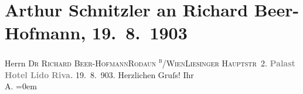 

         
         \renewcommand{\erwaehntePersonen}{Personen: Richard Beer-Hofmann}
         \renewcommand{\erwaehnteOrte}{Orte: Liesingerstraße, Palast Hotel Lido, Riva del Garda, Rodaun}
         \renewcommand{\erwaehnteWerke}{}
               \section[Arthur Schnitzler an Richard Beer-Hofmann, 19. 8. 1903]{ Arthur Schnitzler an Richard Beer-Hofmann, 19. 8. 1903}\nopagebreak{}\rehead{ }\begin{ledgroupsized}[t]{13cm}\normalsize\beginnumbering \toendnotes[C]{\smallbreak\pagebreak[2]} 
\pstart{}{\pb}Herrn \textsc{Dr Richard
                     Beer-Hofmann}\pend{}\pstart{}\textsc{\textsc{Rodaun \textsuperscript{b}/Wien}}\pend{}\pstart{}\textsc{Liesinger Hauptstr 2}.\pend{}{\bigskip}\pstart
           \noindent{}\centering{}{\pb}\textcolor{gray}{\textbf{Palast Hotel Lido}}\pend
           \pstart
           \noindent{}\centering{}\textcolor{gray}{\textbf{Riva.}}\pend
           \pstart
           \raggedleft{}19. 8. 903.\pend
           \pstart
           Herzlichen Gruſs!\pend
           \pstart
           Ihr{\\[\baselineskip]}\spacefill\mbox{A.}\pend
           \leftskip=0em{}
         
         \endnumbering{}\end{ledgroupsized}  \newcommand{\dateiname}{L01310}\newcommand{\titel}{Arthur Schnitzler an Richard Beer-Hofmann, 19. 8. 1903}\newcommand{\editorInnen}{Martin Anton Müller und Gerd-Hermann Susen}
      